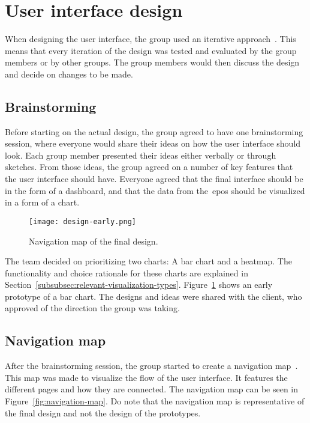 \section{User interface design}\label{sec:user-interface-design}

When designing the user interface, the group used an iterative approach~\cite{iterative-design}.
This means that every iteration of the design was tested and evaluated by the group members or by other groups.
The group members would then discuss the design and decide on changes to be made.

\subsection{Brainstorming}\label{subsec:brainstorming}

Before starting on the actual design, the group agreed to have one brainstorming session, where everyone would share
their ideas on how the user interface should look.
Each group member presented their ideas either verbally or through sketches.
From those ideas, the group agreed on a number of key features that the user interface should have.
Everyone agreed that the final interface should be in the form of a dashboard, and that the data from
the~\acrshort{epos} should be visualized in a form of a chart.

\begin{figure}[H]
    \centering
    \texttt{[image: design-early.png]}
    \caption{Navigation map of the final design.
    }\label{fig:design-early}
\end{figure}

The team decided on prioritizing two charts: A bar chart and a heatmap.
The functionality and choice rationale for these charts are explained in
Section~\ref{subsubsec:relevant-visualization-types}.
Figure~\ref{fig:design-early} shows an early prototype of a bar chart.
The designs and ideas were shared with the client, who approved of the direction the group was taking.

\subsection{Navigation map}\label{subsec:navigation-map}

After the brainstorming session, the group started to create a navigation map~\cite{benyon2019}.
This map was made to visualize the flow of the user interface.
It features the different pages and how they are connected.
The navigation map can be seen in Figure~\ref{fig:navigation-map}.
Do note that the navigation map is representative of the final design and not the design of the prototypes.

